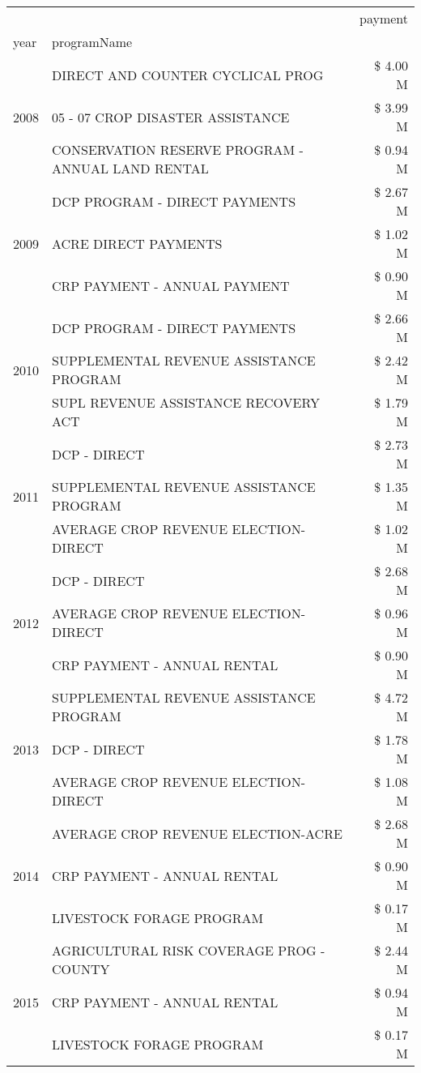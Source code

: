 \begin{tabular}{llr}
\toprule
 &  & payment \\
year & programName &  \\
\midrule
\multirow[t]{3}{*}{2008} & DIRECT AND COUNTER CYCLICAL PROG & \$ 4.00 M \\
 & 05 - 07 CROP DISASTER ASSISTANCE & \$ 3.99 M \\
 & CONSERVATION RESERVE PROGRAM - ANNUAL LAND RENTAL & \$ 0.94 M \\
\cline{1-3}
\multirow[t]{3}{*}{2009} & DCP PROGRAM - DIRECT PAYMENTS & \$ 2.67 M \\
 & ACRE DIRECT PAYMENTS & \$ 1.02 M \\
 & CRP PAYMENT - ANNUAL PAYMENT & \$ 0.90 M \\
\cline{1-3}
\multirow[t]{3}{*}{2010} & DCP PROGRAM - DIRECT PAYMENTS & \$ 2.66 M \\
 & SUPPLEMENTAL REVENUE ASSISTANCE PROGRAM & \$ 2.42 M \\
 & SUPL REVENUE ASSISTANCE RECOVERY ACT & \$ 1.79 M \\
\cline{1-3}
\multirow[t]{3}{*}{2011} & DCP - DIRECT & \$ 2.73 M \\
 & SUPPLEMENTAL REVENUE ASSISTANCE PROGRAM & \$ 1.35 M \\
 & AVERAGE CROP REVENUE ELECTION-DIRECT & \$ 1.02 M \\
\cline{1-3}
\multirow[t]{3}{*}{2012} & DCP - DIRECT & \$ 2.68 M \\
 & AVERAGE CROP REVENUE ELECTION-DIRECT & \$ 0.96 M \\
 & CRP PAYMENT - ANNUAL RENTAL & \$ 0.90 M \\
\cline{1-3}
\multirow[t]{3}{*}{2013} & SUPPLEMENTAL REVENUE ASSISTANCE PROGRAM & \$ 4.72 M \\
 & DCP - DIRECT & \$ 1.78 M \\
 & AVERAGE CROP REVENUE ELECTION-DIRECT & \$ 1.08 M \\
\cline{1-3}
\multirow[t]{3}{*}{2014} & AVERAGE CROP REVENUE ELECTION-ACRE & \$ 2.68 M \\
 & CRP PAYMENT - ANNUAL RENTAL & \$ 0.90 M \\
 & LIVESTOCK FORAGE PROGRAM & \$ 0.17 M \\
\cline{1-3}
\multirow[t]{3}{*}{2015} & AGRICULTURAL RISK COVERAGE PROG - COUNTY & \$ 2.44 M \\
 & CRP PAYMENT - ANNUAL RENTAL & \$ 0.94 M \\
 & LIVESTOCK FORAGE PROGRAM & \$ 0.17 M \\

\end{tabular}
